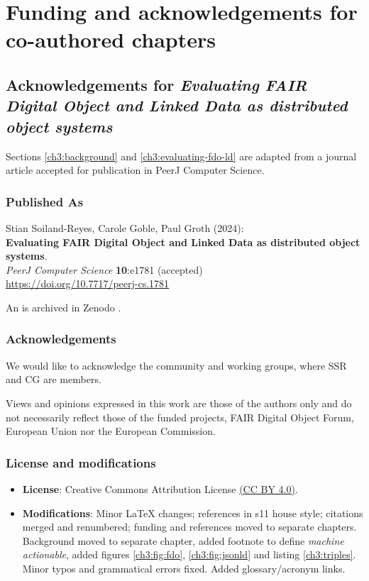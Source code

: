 \section{Funding and acknowledgements for co-authored chapters}


\subsection{Acknowledgements for \textit{Evaluating FAIR Digital Object and Linked Data as distributed object systems}}\label{ch11:fdo}

Sections \vref{ch3:background} and \vref{ch3:evaluating-fdo-ld} are adapted from a journal article accepted for publication in PeerJ Computer Science.

\subsubsection*{Published As}

Stian Soiland-Reyes, Carole Goble, Paul Groth (2024):\\
\textbf{Evaluating FAIR Digital Object and Linked Data as distributed object systems}.\\
\emph{PeerJ Computer Science} \textbf{10}:e1781 (accepted) \\
\url{https://doi.org/10.7717/peerj-cs.1781}

An  is archived in Zenodo \cite{Soiland-Reyes 2023a}.


\subsubsection*{Acknowledgements}

We would like to acknowledge the  community and working groups, where SSR and CG are members.

Views and opinions expressed in this work are those of the authors only and do not necessarily reflect those of the funded projects, FAIR Digital Object Forum, European Union nor the European Commission.

\subsubsection*{License and modifications}

\begin{itemize}
\tightlist
\item
  \textbf{License}: Creative Commons Attribution License
  \href{https://spdx.org/licenses/CC-BY-4.0}{(CC BY 4.0)}.
\item
  \textbf{Modifications}: Minor LaTeX changes; references in s11 house style; 
  citations merged and renumbered; 
  funding and references moved to separate chapters. Background moved to separate chapter, added footnote to define \emph{machine actionable}, added figures \ref{ch3:fig:fdo}, \ref{ch3:fig:jsonld} and listing \ref{ch3:triples}. Minor typos and grammatical errors fixed.  Added glossary/acronym links.
\end{itemize}

